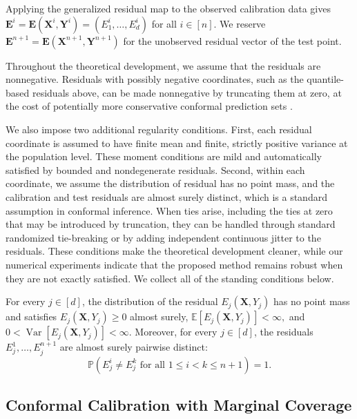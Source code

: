 {Applying the generalized residual map to the observed calibration data gives
$\mathbf{E}^i=\mathbf E(\mathbf X^i,\mathbf Y^i)=(E_1^i,\ldots,E_d^i)$ for all
$i\in[n]$. We reserve
$\mathbf{E}^{n+1}=\mathbf E(\mathbf X^{n+1},\mathbf Y^{n+1})$ for the
unobserved residual vector of the test point.

Throughout the theoretical development, we assume that the residuals are nonnegative. Residuals with possibly negative coordinates, such as the quantile-based residuals above, can be made nonnegative by truncating them at zero, at the cost of potentially more conservative conformal prediction sets \citep{romano2019conformalized}.

We also impose two additional regularity conditions. First, each residual
coordinate is assumed to have finite mean and finite, strictly positive
variance at the population level. These moment conditions are mild and automatically satisfied by bounded and nondegenerate
residuals. Second, within each
coordinate, we assume the distribution of residual has no point mass, and the calibration and test residuals are almost surely
distinct, which is a standard assumption in conformal inference.
When ties arise, including the ties at zero that may be introduced by
truncation, they can be handled through standard randomized tie-breaking or
by adding independent continuous jitter to the residuals. These conditions
make the theoretical development cleaner, while our numerical experiments
indicate that the proposed method remains robust when they are not exactly
satisfied. We collect all of the standing conditions below.

\begin{assumption}
\label{eq:assumption-scores}
For every $j\in[d]$, the distribution of the residual $E_j(\mathbf X,Y_j)$ has no point mass and satisfies $E_j(\mathbf X,Y_j)\geq 0 $ almost surely, $
\mathbb E[E_j(\mathbf X,Y_j)]<\infty, $ and $
0<\operatorname{Var}[E_j(\mathbf X,Y_j)]<\infty.$
Moreover, for every $j\in[d]$, the residuals
$E_j^1,\ldots,E_j^{n+1}$ are almost surely pairwise distinct:
\[
\mathbb P\left(
E_j^i\neq E_j^k
\text{ for all }1\leq i<k\leq n+1
\right)=1.
\]
\end{assumption}
}


\subsection{Conformal Calibration with Marginal Coverage}\label{sec:calibration}

